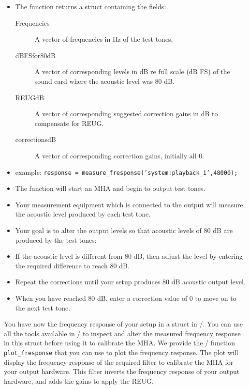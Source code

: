 \documentclass[11pt,a4paper,twoside]{article}
\newcommand{\+}{\discretionary{\mbox{\scriptsize$\hookleftarrow$}}{}{}}
\begin{document}
\begin{itemize}
\begin{itemize}
\begin{enumerate}
    \end{enumerate}
  \item The function returns a struct containing the fields:
    \begin{description}
    \item [Frequencies] A vector of frequencies in Hz of the test tones,
    \item [dBFSfor80dB] A vector of corresponding levels in dB re full scale (dB FS) of the sound card where the acoustic level was 80 dB.
    \item [REUGdB] A vector of corresponding suggested correction gains in dB to compensate for REUG.
    \item [correctionsdB] A vector of corresponding correction gains, initially all 0.
    \end{description}
  \item
    example: \texttt{response = measure\_fresponse('system:playback\_1',48000);}
  \item
    The function will start an MHA and begin to output test tones.
  \item
    Your measurement equipment which is connected to the output will
    measure the acoustic level produced by each test tone.
  \item
    Your goal is to alter the output levels so that acoustic levels of
    80 dB are produced by the test tones:
  \item
    If the acoustic level is different from 80 dB, then adjust the level
    by entering the required difference to reach 80 dB.
  \item
    Repeat the corrections until your setup produces 80 dB acoustic
    output level.
  \item
    When you have reached 80 dB, enter a correction value of 0 to move
    on to the next test tone.
  \end{itemize}
\end{itemize}
  
You have now the frequency response of your setup in a struct in
\Octave{}/\Matlab{}.
%
You can use all the tools available in \Octave{}/\Matlab{} to inspect
and alter the measured frequency response in this struct before using
it to calibrate the MHA.
%
We provide the \Octave{}/\Matlab{} function \texttt{plot\_fresponse}
that you can use to plot the frequency response.
%
The plot will display the frequency response of the required filter to
calibrate the MHA for your output hardware.
%
This filter inverts the frequency response of your output hardware, and
adds the gains to apply the REUG.
\end{document}
